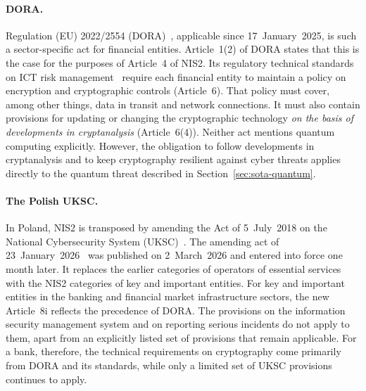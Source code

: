 \paragraph{DORA.}
Regulation (EU) 2022/2554 (DORA)~\cite{dora}, applicable since
17~January~2025, is such a sector-specific act for financial entities.
Article~1(2) of DORA states that this is the case for the purposes of
Article~4 of NIS2. Its regulatory technical standards on ICT risk
management~\cite{dorarts} require each financial entity to maintain a policy
on encryption and cryptographic controls (Article~6). That policy must cover,
among other things, data in transit and network connections. It must also
contain provisions for updating or changing the cryptographic technology
\emph{on the basis of developments in cryptanalysis} (Article~6(4)).
Neither act mentions quantum computing explicitly. However, the obligation to
follow developments in cryptanalysis and to keep cryptography resilient
against cyber threats applies directly to the quantum threat described in
Section~\ref{sec:sota-quantum}.

\paragraph{The Polish UKSC.}
In Poland, NIS2 is transposed by amending the Act of 5~July~2018 on the
National Cybersecurity System (UKSC)~\cite{uksc}. The amending act of
23~January~2026~\cite{uksc2026} was published on 2~March~2026 and entered
into force one month later. It replaces the earlier categories of operators
of essential services with the NIS2 categories of key and important entities.
For key and important entities in the banking and financial market
infrastructure sectors, the new Article~8i reflects the precedence of DORA.
The provisions on the information security management system and on reporting
serious incidents do not apply to them, apart from an explicitly listed set of
provisions that remain applicable. For a bank, therefore, the technical
requirements on cryptography come primarily from DORA and its standards, while
only a limited set of UKSC provisions continues to apply.

